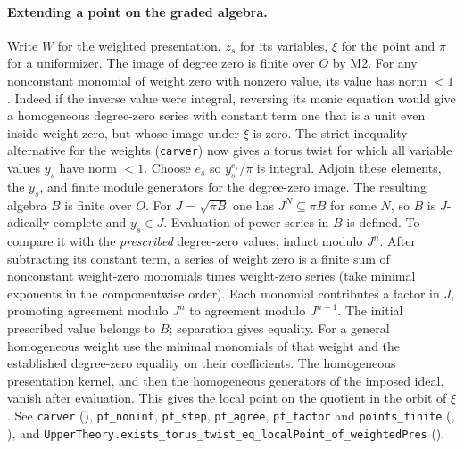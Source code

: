 \paragraph{Extending a point on the graded algebra.}
Write $W$ for the weighted presentation, $z_s$ for its variables,
$\xi$ for the point and $\pi$ for a uniformizer. The image of degree
zero is finite over $O$ by M2. For any nonconstant monomial of
weight zero with nonzero value, its value has norm $<1$. Indeed if
the inverse value were integral, reversing its monic equation would
give a homogeneous degree-zero series with constant term one that is a
unit even inside weight zero, but whose image under $\xi$ is zero.
The strict-inequality alternative for the weights (\nolinkurl{carver}) now
gives a torus twist for which all variable values $y_s$ have norm $<1$.
Choose $e_s$ so $y_s^{e_s}/\pi$ is integral. Adjoin these elements,
the $y_s$, and finite module generators for the degree-zero image.
The resulting algebra $B$ is finite over $O$. For
$J=\sqrt{\pi B}$ one has $J^N\subseteq\pi B$ for some $N$, so $B$ is
$J$-adically complete and $y_s\in J$. Evaluation of power series in $B$
is defined. To compare it with the \emph{prescribed} degree-zero values,
induct modulo $J^n$. After subtracting its constant term, a series of
weight zero is a finite sum of nonconstant weight-zero monomials times
weight-zero series (take minimal exponents in the componentwise order).
Each monomial contributes a factor in $J$, promoting agreement modulo
$J^n$ to agreement modulo $J^{n+1}$. The initial prescribed value belongs
to $B$; separation gives equality. For a general homogeneous weight use
the minimal monomials of that weight and the established degree-zero
equality on their coefficients. The homogeneous presentation kernel,
and then the homogeneous generators of the imposed ideal, vanish after
evaluation. This gives the local point on the quotient in the orbit of
$\xi$. See \nolinkurl{carver} (),
\nolinkurl{pf_nonint}, \nolinkurl{pf_step}, \nolinkurl{pf_agree}, \nolinkurl{pf_factor}
and \nolinkurl{points_finite} (,
), and
\nolinkurl{UpperTheory.exists_torus_twist_eq_localPoint_of_weightedPres}
().

